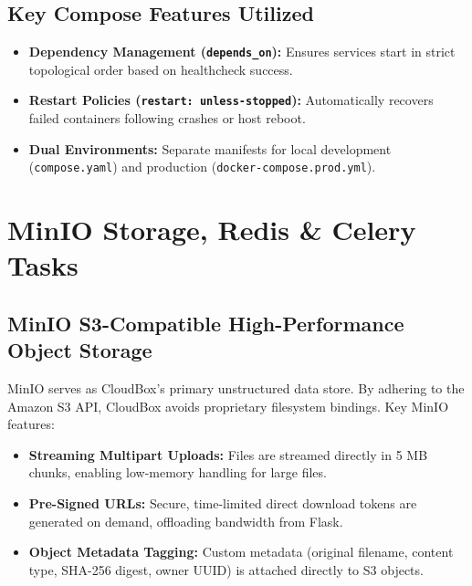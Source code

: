 \documentclass[11pt,a4paper]{report}
\begin{document}
\section{Key Compose Features Utilized}
\begin{itemize}[itemsep=1pt,topsep=1pt]
    \item \textbf{Dependency Management (\texttt{depends\_on}):} Ensures services start in strict topological order based on healthcheck success.
    \item \textbf{Restart Policies (\texttt{restart: unless-stopped}):} Automatically recovers failed containers following crashes or host reboot.
    \item \textbf{Dual Environments:} Separate manifests for local development (\texttt{compose.yaml}) and production (\texttt{docker-compose.prod.yml}).
\end{itemize}

\clearpage

\chapter{MinIO Storage, Redis \& Celery Tasks}

\section{MinIO S3-Compatible High-Performance Object Storage}
MinIO serves as CloudBox's primary unstructured data store. By adhering to the Amazon S3 API, CloudBox avoids proprietary filesystem bindings. Key MinIO features:
\begin{itemize}[itemsep=1pt,topsep=1pt]
    \item \textbf{Streaming Multipart Uploads:} Files are streamed directly in 5 MB chunks, enabling low-memory handling for large files.
    \item \textbf{Pre-Signed URLs:} Secure, time-limited direct download tokens are generated on demand, offloading bandwidth from Flask.
    \item \textbf{Object Metadata Tagging:} Custom metadata (original filename, content type, SHA-256 digest, owner UUID) is attached directly to S3 objects.
\end{itemize}
\end{document}
